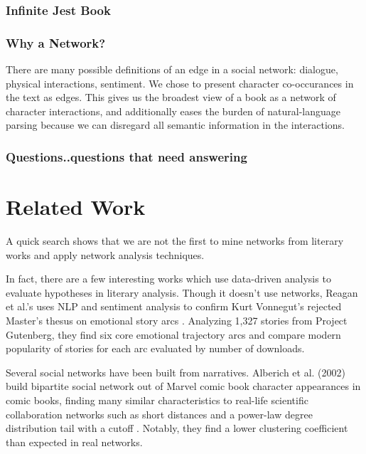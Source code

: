\documentclass[12pt]{article}
\begin{document}

\subsubsection*{Infinite Jest Book}

\subsubsection*{Why a Network?}

There are many possible definitions of an edge in a social network: dialogue, physical interactions, sentiment. 
We chose to present character co-occurances in the text as edges. 
This gives us the broadest view of a book as a network of character interactions, and additionally eases the burden of natural-language parsing because we can disregard all semantic information in the interactions.

\subsubsection*{Questions..questions that need answering}

\section{Related Work}

A quick search shows that we are not the first to mine networks from literary works and apply network analysis techniques.

In fact, there are a few interesting works which use data-driven analysis to evaluate hypotheses in literary analysis. 
Though it doesn't use networks, Reagan et al.'s uses NLP and sentiment analysis to confirm Kurt Vonnegut's rejected Master's thesus on emotional story arcs \cite{Reagan2016}. 
Analyzing 1,327 stories from Project Gutenberg, they find six core emotional trajectory arcs and compare modern popularity of stories for each arc evaluated by number of downloads.

Several social networks have been built from narratives. 
Alberich et al. (2002) build bipartite social network out of Marvel comic book character appearances in comic books, finding many similar characteristics to real-life scientific collaboration networks such as short distances and a power-law degree distribution tail with a cutoff \cite{2002marvel}. Notably, they find a lower clustering coefficient than expected in real networks.
\end{document}

